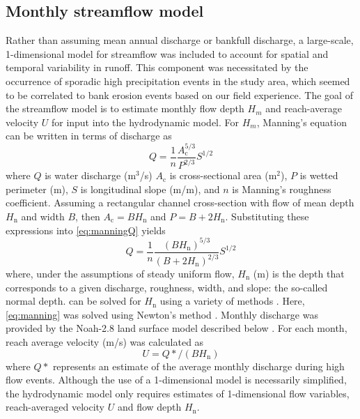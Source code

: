 \documentclass[preprint, review, authoryear, 12pt]{elsarticle}
\begin{document}
\subsection{Monthly streamflow model}\label{sec:1d}
Rather than assuming mean annual discharge or bankfull discharge, a large-scale, 1-dimensional model for streamflow was included to account for spatial and temporal variability in runoff. This component was necessitated by the occurrence of sporadic high precipitation events in the study area, which seemed to be correlated to bank erosion events based on our field experience. The goal of the streamflow model is to estimate monthly flow depth $H_m$ and reach-average velocity $U$ for input into the hydrodynamic model. For $H_m$, Manning's equation can be written in terms of discharge as
\begin{equation}\label{eq:manningQ}
Q = \frac{1}{n}\frac{\displaystyle A_\text{c}^{5/3}}{\displaystyle P^{2/3}}S^{1/2}
\end{equation}
where $Q$ is water discharge (m$^3$/s) $A_\text{c}$ is cross-sectional area (m$^2$), $P$ is wetted perimeter (m), $S$ is longitudinal slope (m/m), and $n$ is Manning's roughness coefficient. Assuming a rectangular channel cross-section with flow of mean depth $H_\text{n}$ and width $B$, then $A_\text{c}=BH_\text{n}$ and $P=B+2H_\text{n}$. Substituting these expressions into \cref{eq:manningQ} yields
\begin{equation}\label{eq:manning}
Q = \frac{1}{n}\frac{\displaystyle\left(BH_\text{n}\right)^{5/3}}
{\displaystyle \left(B+2H_\text{n}\right)^{2/3}}S^{1/2}
\end{equation}
where, under the assumptions of steady uniform flow, $H_\text{n}$ (m) is the depth that corresponds to a given discharge, roughness, width, and slope: the so-called normal depth.  can be solved for $H_\text{n}$ using a variety of methods \citep{Vatankhah2013}. Here, \cref{eq:manning} was solved using Newton's method \citep{Tiwari2012}. Monthly discharge was provided by the Noah-2.8 land surface model described below \citep{Sexton2013}. For each month, reach average velocity (m/s) was calculated as
\begin{equation}
U = Q*/(BH_\text{n})
\end{equation}
where $Q*$ represents an estimate of the average monthly discharge during high flow events. Although the use of a 1-dimensional model is necessarily simplified, the hydrodynamic model only requires estimates of 1-dimensional flow variables, reach-averaged velocity $U$ and flow depth $H_\text{n}$.
\end{document}
